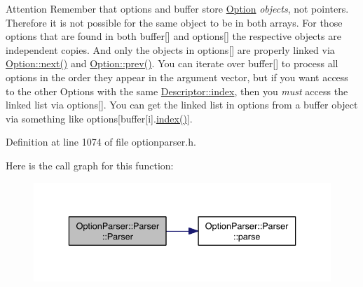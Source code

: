 \begin{DoxyAttention}{Attention}
Remember that {\ttfamily options} and {\ttfamily buffer} store \hyperlink{class_option_parser_1_1_option}{Option} {\itshape objects}, not pointers. Therefore it is not possible for the same object to be in both arrays. For those options that are found in both {\ttfamily buffer}\mbox{[}\mbox{]} and {\ttfamily options}\mbox{[}\mbox{]} the respective objects are independent copies. And only the objects in {\ttfamily options}\mbox{[}\mbox{]} are properly linked via \hyperlink{class_option_parser_1_1_option_ab06f7c1798782d301d35265eda2b95a5}{Option\-::next()} and \hyperlink{class_option_parser_1_1_option_aa17639d1c0e0ae5eae682080ae93d5a3}{Option\-::prev()}. You can iterate over {\ttfamily buffer}\mbox{[}\mbox{]} to process all options in the order they appear in the argument vector, but if you want access to the other Options with the same \hyperlink{struct_option_parser_1_1_descriptor_ae62860781844b44c0bd4f730c96701d7}{Descriptor\-::index}, then you {\itshape must} access the linked list via {\ttfamily options}\mbox{[}\mbox{]}. You can get the linked list in options from a buffer object via something like {\ttfamily options}\mbox{[}buffer\mbox{[}i\mbox{]}.\hyperlink{namespace_networ_kit_af49e67df68af41dcd75dffbb1e9abee6}{index()}\mbox{]}. 
\end{DoxyAttention}
 

Definition at line 1074 of file optionparser.\-h.



Here is the call graph for this function\-:\nopagebreak
\begin{figure}[H]
\begin{center}
\leavevmode
\includegraphics[width=336pt]{class_option_parser_1_1_parser_a7a82d034afe73e9954c47ab7363dfa5c_cgraph}
\end{center}
\end{figure}


